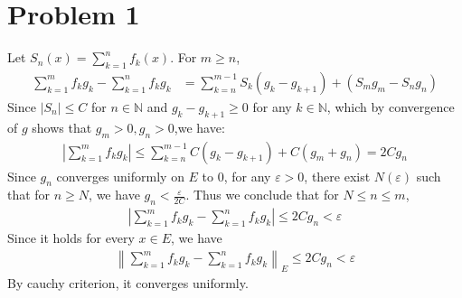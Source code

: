 \documentclass{report}
\def\ve{\varepsilon}
\begin{document}
    \section*{Problem 1}
    Let $S_n(x) = \sum_{k=1}^n f_k(x)$. For $m \ge n$,
    \begin{align*}
        \sum_{k=1}^m f_k g_k - \sum_{k=1}^n f_k g_k &= \sum_{k=n}^{m-1}S_k(g_k-g_{k+1})
            + (S_m g_m - S_n g_n) 
    \end{align*}
    Since $|S_n| \le C$ for $n \in \mathbb{N}$ and $g_k - g_{k+1} \ge 0$ for any 
    $k \in \mathbb{N}$, which by convergence of $g$ shows that $g_m > 0, g_n > 0$,we have:
    \begin{align*}
        \left| \sum_{k=1}^m f_k g_k\right| \le \sum_{k=n}^{m-1} C (g_k-g_{k+1}) + 
            C(g_m + g_n) = 2Cg_n
    \end{align*}
    Since $g_n$ converges uniformly on $E$ to 0, for any $\varepsilon > 0$, there 
    exist $N(\varepsilon)$ such that for $n \ge N$, we have $g_n<\frac{\varepsilon}{2C}$.
    Thus we conclude that for $N \le n \le m$, 
    \begin{align*}
        \left| \sum_{k=1}^m f_k g_k - \sum_{k=1}^n f_k g_k\right| \le 2Cg_n < \varepsilon
    \end{align*}
    Since it holds for every $x \in E$, we have 
    \begin{align*}
        \left\| \sum_{k=1}^m f_k g_k-\sum_{k=1}^n f_k g_k \right\|_E \le 2Cg_n < \ve
    \end{align*}
    By cauchy criterion, it converges uniformly.
    
\end{document}
